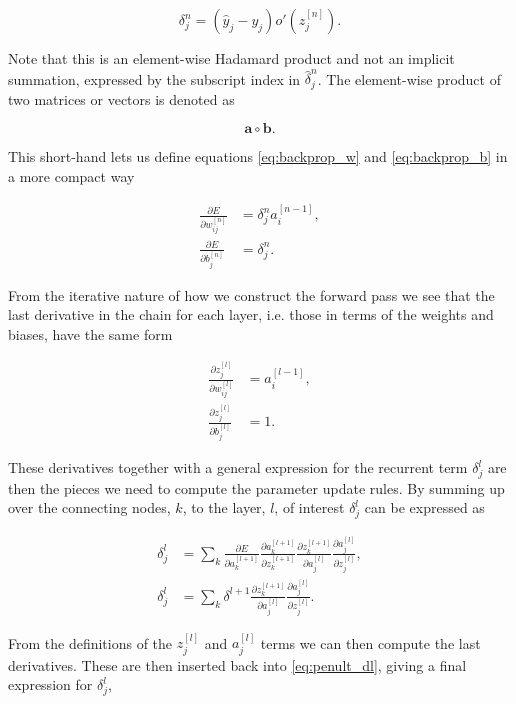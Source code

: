 \begin{equation}
\delta^n_j = (\hat{y}_j - y_j)o'(z_j^{[n]}).
\end{equation}

\noindent Note that this is an element-wise Hadamard product and not an implicit summation, expressed by the subscript index in $\hat{\delta}^n_j$.
The element-wise product of two matrices or vectors is denoted as  

\begin{equation}
\mathbf{a} \circ \mathbf{b}.
\end{equation}

\noindent This short-hand lets us define equations \ref{eq:backprop_w} and \ref{eq:backprop_b} in a more compact way

\begin{align}
\frac{\partial E}{\partial w_{ij}^{[n]}} &= \delta^n_j a^{[n-1]}_i,\\
\frac{\partial E}{\partial b_{j}^{[n]}} &= \delta^n_j.
\end{align} 

\noindent From the iterative nature of how we construct the forward pass we see that the last derivative in the chain for each layer, i.e. those in terms of the weights and biases, have the same form 

\begin{align}
\frac{\partial z_j^{[l]}}{\partial w_{ij}^{[l]}} &= a^{[l-1]}_i, \\
\frac{\partial z_j^{[l]}}{\partial b_{j}^{[l]}} &= 1.
\end{align}

\noindent These derivatives together with a general expression for the recurrent term $\delta^l_j$ are then the pieces we need to compute the parameter update rules. By summing up over the connecting nodes, $k$, to the layer, $l$, of interest $\delta_j^l$ can be expressed as

\begin{align}
\delta_j^l &= 
\sum_k \frac{\partial E}{\partial a_k^{[l+1]}} 
\frac{\partial a_k^{[l+1]}}{\partial z_k^{[l+1]}} 
\frac{\partial z_k^{[l+1]}}{\partial a_j^{[l]}} 
\frac{\partial a_j^{[l]}}{\partial z_j^{[l]}},\\
\delta_j^l &= 
\sum_k \delta^{l+1} \frac{\partial z_k^{[l+1]}}{\partial a_j^{[l]}} 
\frac{\partial a_j^{[l]}}{\partial z_j^{[l]}} \label{eq:penult_dl}.
\end{align}

\noindent From the definitions of the $z_j^{[l]}$ and $a_j^{[l]}$ terms we can then compute the last derivatives. These are then inserted back into \ref{eq:penult_dl}, giving a final expression for $\delta_j^l$,

